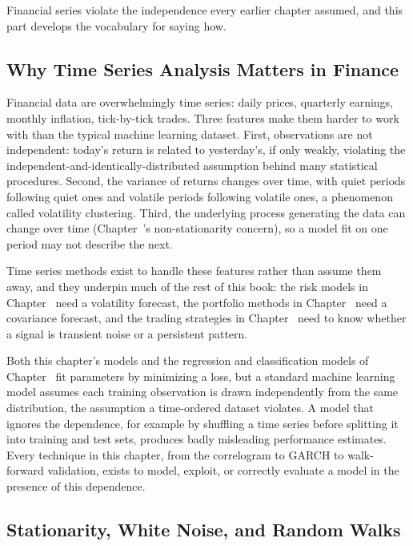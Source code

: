 \documentclass[../ai_in_finance]{subfiles}
\begin{document}
Financial series violate the independence every earlier chapter assumed, and this part develops the vocabulary for saying how.

\subsection{Why Time Series Analysis Matters in Finance}

Financial data are overwhelmingly time series: daily prices, quarterly earnings, monthly inflation, tick-by-tick trades. Three features make them harder to work with than the typical machine learning dataset. First, observations are not independent: today's return is related to yesterday's, if only weakly, violating the independent-and-identically-distributed assumption behind many statistical procedures. Second, the variance of returns changes over time, with quiet periods following quiet ones and volatile periods following volatile ones, a phenomenon called volatility clustering.
Third, the underlying process generating the data can change over time (Chapter~'s non-stationarity concern), so a model fit on one period may not describe the next.

Time series methods exist to handle these features rather than assume them away, and they underpin much of the rest of this book: the risk models in Chapter~ need a volatility forecast, the portfolio methods in Chapter~ need a covariance forecast, and the trading strategies in Chapter~ need to know whether a signal is transient noise or a persistent pattern.

Both this chapter's models and the regression and classification models of Chapter~ fit parameters by minimizing a loss, but a standard machine learning model assumes each training observation is drawn independently from the same distribution, the assumption a time-ordered dataset violates. A model that ignores the dependence, for example by shuffling a time series before splitting it into training and test sets, produces badly misleading performance estimates. Every technique in this chapter, from the correlogram to GARCH to walk-forward validation, exists to model, exploit, or correctly evaluate a model in the presence of this dependence.

\subsection{Stationarity, White Noise, and Random Walks}
\label{sec:random-walk}
\end{document}
